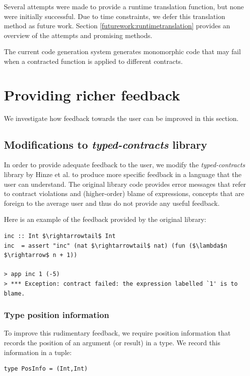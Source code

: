 \documentclass[10pt]{report}
\begin{document}
{Several attempts were made to provide a runtime translation function, but none were initially successful.
Due to time constraints, we defer this translation method as future work.
Section \ref{futurework:runtimetranslation} provides an overview of the attempts and promising methods.

The current code generation system generates monomorphic code that may fail when a contracted function is applied to different contracts.

\section{Providing richer feedback}

We investigate how feedback towards the user can be improved in this section.

\subsection{Modifications to \textit{typed-contracts} library}
\label{modificationstotypedcontracts}
In order to provide adequate feedback to the user, we modify the \textit{typed-contracts} library by Hinze et al. \cite{Hinze06typedcontracts} to produce more specific feedback in a language that the user can understand.
The original library code provides error messages that refer to contract violations and (higher-order) blame of expressions, concepts that are foreign to the average user and thus do not provide any useful feedback.

Here is an example of the feedback provided by the original library:

\begin{lstlisting}[mathescape]
inc :: Int $\rightarrowtail$ Int
inc  = assert "inc" (nat $\rightarrowtail$ nat) (fun ($\lambda$n $\rightarrow$ n + 1))

> app inc 1 (-5)
> *** Exception: contract failed: the expression labelled `1' is to blame.
\end{lstlisting}

\subsubsection{Type position information}

To improve this rudimentary feedback, we require position information that records the position of an argument (or result) in a type.
We record this information in a tuple:

\begin{lstlisting}
type PosInfo = (Int,Int)
\end{lstlisting}

}
\end{document}
